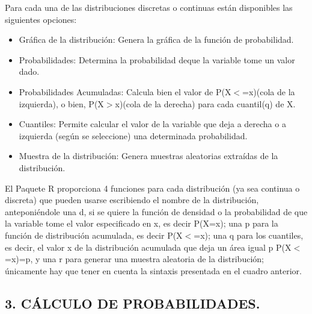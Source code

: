 \documentclass[12pt,letterpaper]{article}\usepackage[]{graphicx}\usepackage[]{color}
\begin{document}
Para cada una de las distribuciones discretas o continuas est\'an disponibles las siguientes opciones:
\begin{itemize}
  \item Gr\'afica de la distribuci\'on: Genera la gr\'afica de la funci\'on de probabilidad.
   \item Probabilidades: Determina la probabilidad deque la variable tome un valor dado. 
    \item Probabilidades Acumuladas: Calcula bien el valor de P(X$<$=x)(cola de la izquierda), o bien, P(X$>$x)(cola de la derecha) para cada cuantil(q) de X.
    \item Cuantiles: Permite calcular el valor de la variable que deja a derecha o a izquierda (seg\'un se seleccione) una determinada probabilidad. 
    \item Muestra de la distribuci\'on: Genera muestras aleatorias extra\'idas de la distribuci\'on. 
\end{itemize}

El Paquete R proporciona 4 funciones para cada distribuci\'on (ya sea continua o discreta) que pueden usarse escribiendo el nombre de la distribuci\'on, anteponi\'endole una d, si se quiere la funci\'on de densidad o la probabilidad de que la variable tome el valor especificado en x, es decir P(X=x); una p para la funci\'on de distribuci\'on acumulada, es decir P(X$<$=x); una q para los cuantiles, es decir, el valor x de la distribuci\'on acumulada que deja un área igual p P(X$<$=x)=p, y una r para generar una muestra aleatoria de la distribuci\'on; \'unicamente hay que tener en cuenta la sintaxis presentada en el cuadro anterior.\\

\newpage
\begin{center}
\subsection*{3. C\'ALCULO DE PROBABILIDADES.}
\end{center}
\end{document}
